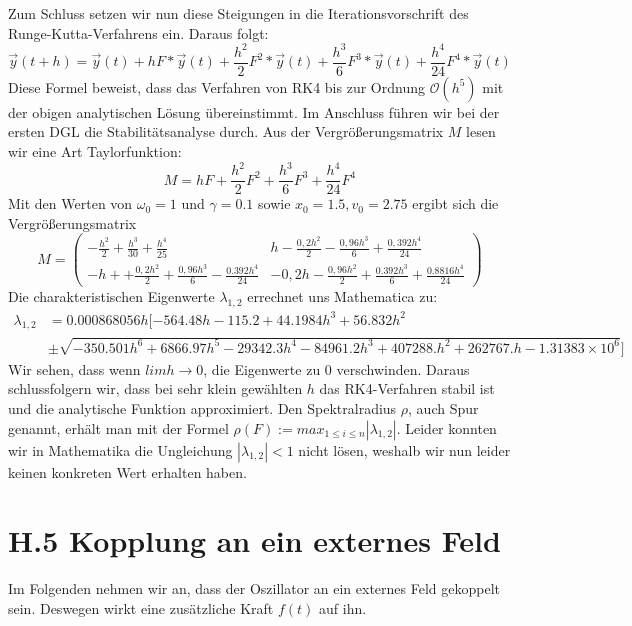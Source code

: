 \documentclass[ngerman]{scrartcl}
\begin{document}
Zum Schluss setzen wir nun diese Steigungen in die Iterationsvorschrift des Runge-Kutta-Verfahrens ein. Daraus folgt: \begin{equation} \vec{y}(t+h) = \vec{y}(t) + hF*\vec{y}(t) + \frac{h^2}{2}F^2*\vec{y}(t) + \frac{h^3}{6}F^3*\vec{y}(t) + \frac{h^4}{24}F^4*\vec{y}(t) \end{equation} Diese Formel beweist, dass das Verfahren von RK4 bis zur Ordnung $\mathcal{O}(h^5)$ mit der obigen analytischen Lösung übereinstimmt. \newline
Im Anschluss führen wir bei der ersten DGL die Stabilitätsanalyse durch. Aus der Vergrößerungsmatrix $M$ lesen wir eine Art Taylorfunktion: \begin{equation*} M = hF + \frac{h^2}{2}F^2 + \frac{h^3}{6}F^3 + \frac{h^4}{24}F^4 \end{equation*}
Mit den Werten von $\omega_{0}=1$ und $\gamma=0.1$ sowie $x_{0}=1.5, v_{0}=2.75$  ergibt sich die Vergrößerungsmatrix \begin{equation} M = \begin{pmatrix} -\frac{h^2}{2}+\frac{h^3}{30}+\frac{h^4}{25} & h-\frac{0,2h^2}{2} - \frac{0,96h^3}{6} + \frac{0,392h^4}{24}\\  -h++\frac{0,2h^2}{2} + \frac{0,96h^3}{6} - \frac{0.392h^4}{24} & -0,2h-\frac{0,96h^2}{2} + \frac{0.392h^3}{6} + \frac{0.8816h^4}{24}  \end{pmatrix}\end{equation}
Die charakteristischen Eigenwerte $\lambda_{1,2}$ errechnet uns Mathematica zu: \begin{align*}  \lambda_{1,2} &=0.000868056 h [-564.48 h-115.2+44.1984 h^3+56.832 h^2 \\  & \pm \sqrt{-350.501 h^6+6866.97 h^5-29342.3 h^4-84961.2 h^3+407288.h^2+262767. h-1.31383\times 10^6}]  \end{align*} Wir sehen, dass wenn $lim {h \to 0}$, die Eigenwerte zu 0 verschwinden. Daraus schlussfolgern wir, dass bei sehr klein gewählten $h$ das RK4-Verfahren stabil ist und die analytische Funktion approximiert. Den Spektralradius $\rho$, auch Spur genannt, erhält man mit der Formel $\rho(F):=max_{1 \leq i  \leq n} |\lambda_{1,2}|$. Leider konnten wir in Mathematika die Ungleichung $|\lambda_{1,2}| < 1$ nicht lösen, weshalb wir nun leider keinen konkreten Wert erhalten haben.
\section{H.5 Kopplung an ein externes Feld}
Im Folgenden nehmen wir an, dass der Oszillator an ein externes Feld gekoppelt sein. Deswegen wirkt eine zusätzliche Kraft $f(t)$ auf ihn. 
\end{document}
